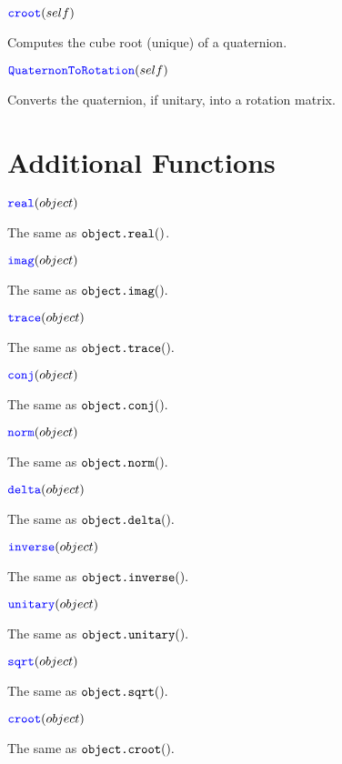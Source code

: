 \documentclass[11pt]{paper}
\begin{document}
\medskip
\noindent $\textcolor{blue}{\texttt{\mbox{croot}}}(self)$ 

Computes the cube root (unique) of a quaternion.

\medskip
\noindent $\textcolor{blue}{\texttt{\mbox{QuaternonToRotation}}}(self)$ 

Converts the quaternion, if unitary, into a rotation matrix.

\bigskip

\section{Additional Functions}

\noindent $\textcolor{blue}{\texttt{\mbox{real}}}(object)$ 

The same as $\texttt{\mbox{object.real}}()$.

\medskip
\noindent $\textcolor{blue}{\texttt{\mbox{imag}}}(object)$ 

The same as $\texttt{\mbox{object.imag}}().$

\medskip
\noindent $\textcolor{blue}{\texttt{\mbox{trace}}}(object)$ 

The same as $\texttt{\mbox{object.trace}}().$

\medskip
\noindent $\textcolor{blue}{\texttt{\mbox{conj}}}(object)$ 

The same as $\texttt{\mbox{object.conj}}().$

\medskip
\noindent $\textcolor{blue}{\texttt{\mbox{norm}}}(object)$ 

The same as $\texttt{\mbox{object.norm}}().$

\medskip
\noindent $\textcolor{blue}{\texttt{\mbox{delta}}}(object)$ 

The same as $\texttt{\mbox{object.delta}}().$

\medskip
\noindent $\textcolor{blue}{\texttt{\mbox{inverse}}}(object)$ 

The same as $\texttt{\mbox{object.inverse}}().$

\medskip
\noindent $\textcolor{blue}{\texttt{\mbox{unitary}}}(object)$ 

The same as $\texttt{\mbox{object.unitary}}().$

\medskip
\noindent $\textcolor{blue}{\texttt{\mbox{sqrt}}}(object)$ 

The same as $\texttt{\mbox{object.sqrt}}().$

\medskip
\noindent $\textcolor{blue}{\texttt{\mbox{croot}}}(object)$ 

The same as $\texttt{\mbox{object.croot}}().$
\end{document}
